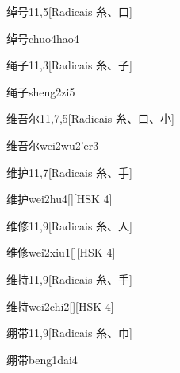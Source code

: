 \begin{entry}{绰号}{11,5}[Radicais ⽷、⼝]
  \begin{phonetics}{绰号}{chuo4hao4}
  \end{phonetics}
\end{entry}

\begin{entry}{绳子}{11,3}[Radicais ⽷、⼦]
  \begin{phonetics}{绳子}{sheng2zi5}
  \end{phonetics}
\end{entry}

\begin{entry}{维吾尔}{11,7,5}[Radicais ⽷、⼝、⼩]
  \begin{phonetics}{维吾尔}{wei2wu2'er3}
  \end{phonetics}
\end{entry}

\begin{entry}{维护}{11,7}[Radicais ⽷、⼿]
  \begin{phonetics}{维护}{wei2hu4}[][HSK 4]
  \end{phonetics}
\end{entry}

\begin{entry}{维修}{11,9}[Radicais ⽷、⼈]
  \begin{phonetics}{维修}{wei2xiu1}[][HSK 4]
  \end{phonetics}
\end{entry}

\begin{entry}{维持}{11,9}[Radicais ⽷、⼿]
  \begin{phonetics}{维持}{wei2chi2}[][HSK 4]
  \end{phonetics}
\end{entry}

\begin{entry}{绷带}{11,9}[Radicais ⽷、⼱]
  \begin{phonetics}{绷带}{beng1dai4}
  \end{phonetics}
\end{entry}

